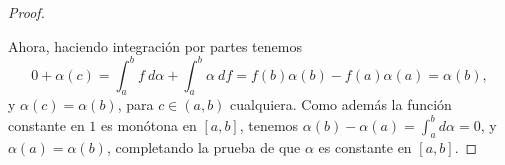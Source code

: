 \begin{proof}
\begin{itemize}
  \end{itemize}
  Ahora, haciendo integración por partes tenemos
  \begin{equation*}
    0+\alpha\left(c\right)=\int_a^b f\ d\alpha + \int_a^b\alpha\ df= f\left(b\right)\alpha\left(b\right)-f\left(a\right)\alpha\left(a\right)=\alpha\left(b\right),
  \end{equation*}
  y $\alpha\left(c\right)=\alpha\left(b\right)$, para $c\in\left(a,b\right)$ cualquiera. Como además la función constante en $1$ es monótona en $\left[a,b\right]$, tenemos $\alpha\left(b\right)-\alpha\left(a\right)=\int_a^bd\alpha=0$, y $\alpha\left(a\right)=\alpha\left(b\right)$, completando la prueba de que $\alpha$ es constante en $\left[a,b\right]$.
  
\end{proof}


